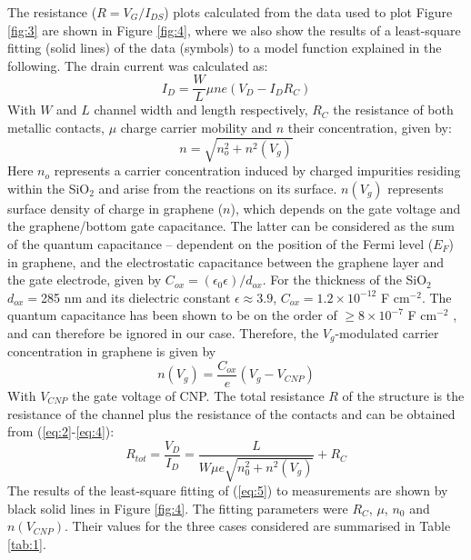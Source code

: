 \documentclass[review]{elsarticle}
\begin{document}
The resistance ($R=V_{G}/I_{DS}$) plots calculated from the data used to plot Figure \ref{fig:3} are shown in Figure \ref{fig:4}, where we also show the results of a least-square fitting (solid lines) of the data (symbols) to a model function explained in the following.
The drain current was calculated as:
  \begin{equation}
    \label{eq:2}
    I_{D}=\frac{W}{L}\mu n e(V_{D}- I_{D}R_{C})
  \end{equation}
  \noindent With $W$ and $L$ channel width and length respectively, $R_{C}$ the resistance of both metallic contacts, $\mu$ charge carrier mobility and $n$ their concentration,
   given by:
  \begin{equation}
    \label{eq:3}
    n=\sqrt{n_{o}^{2}+n^{2}(V_{g})}
  \end{equation}
 Here $n_o$ represents a carrier concentration induced by charged impurities residing within the SiO$_{2}$ and arise from the reactions on its surface\cite{adam-2007}.
 $n(V_{g})$ represents surface density of charge in graphene ($n$), which depends on the gate voltage and the graphene/bottom gate capacitance.
The latter can be considered as the sum of  the quantum capacitance -- dependent on the position of the  Fermi level ($E_F$)  in  graphene, 
 and the electrostatic  capacitance between the graphene layer and the gate electrode, given by $C_{ox}=(\epsilon_0\epsilon)/d_{ox}$\cite{sze-2006}.
 For the thickness of the SiO$_{2}$ $d_{ox}=$285 nm and its dielectric constant  $\epsilon \approx 3.9$,  $C_{ox}=1.2\times10^{-12}$ F cm$^{-2}$.
 The quantum capacitance has been shown to be on the order of $ \geq 8 \times10^{-7}$ F cm$^{-2}$ \cite{xia_2009}, and can therefore be ignored in our case\cite{das-2008}. 
 Therefore, the $V_{g}$-modulated carrier concentration in graphene is given by
 \begin{equation}
   \label{eq:4}
   n(V_{g})= \frac{C_{ox}}{e}(V_{g}- V_{CNP})
 \end{equation}
 \noindent With $V_{CNP}$ the gate voltage of CNP\cite{xia-2010}.
 The total resistance $R$ of the structure is the resistance of the  channel plus the resistance of the contacts and can be  obtained from (\ref{eq:2}-\ref{eq:4}):	
 \begin{equation}
	 \label{eq:5}
     R_{tot} = \frac{V_{D}}{I_{D}} = \frac{L}{W\mu e\sqrt{n_{0}^{2}+n^{2}(V_{g})}} +R_{C}
 \end{equation}
 \noindent The results of the least-square fitting of (\ref{eq:5}) to measurements are shown by black solid lines in Figure \ref{fig:4}. The fitting parameters were $R_{C}$, $\mu$, $n_0$ and $n(V_{CNP})$.
 Their  values for the three cases considered are summarised in Table \ref{tab:1}.
\end{document}
